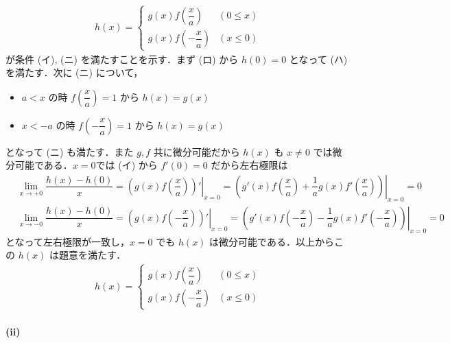 \documentclass[../../main.tex]{subfiles}
\begin{document}
\begin{align}
  h(x) =
  \begin{cases}
    g(x) f\left(\dfrac{x}{a}\right) & (0 \le x) \\
    g(x) f\left(-\dfrac{x}{a}\right) & (x \le 0)
  \end{cases}
\end{align}
が条件 (イ), (ニ) を満たすことを示す．まず (ロ) から $h(0) = 0$ となって (ハ) を満たす．次に (ニ) について，
\begin{itemize}
  \item $a < x$ の時 $f\left(\dfrac{x}{a}\right) = 1$ から $h(x) = g(x)$ \\
  \item $x < -a$ の時 $f\left(-\dfrac{x}{a}\right) = 1$ から $h(x) = g(x)$
\end{itemize}
となって (ニ) も満たす．また $g, f$ 共に微分可能だから $h(x)$ も $x \ne 0$ では微分可能である．$x=0$では (イ) から $f'(0) = 0$ だから左右極限は
\begin{align}
  & \lim_{x \to +0} \dfrac{h(x) - h(0)}{x} = \left. \left( g(x) f\left(\dfrac{x}{a}\right) \right)' \right|_{x=0} = \left. \left( g'(x) f\left(\dfrac{x}{a}\right) + \dfrac{1}{a} g(x) f'\left(\dfrac{x}{a}\right) \right) \right|_{x=0} = 0 \\
  & \lim_{x \to -0} \dfrac{h(x) - h(0)}{x} = \left. \left( g(x) f\left(-\dfrac{x}{a}\right) \right)' \right|_{x=0} = \left. \left( g'(x) f\left(-\dfrac{x}{a}\right) - \dfrac{1}{a} g(x) f'\left(-\dfrac{x}{a}\right) \right) \right|_{x=0} = 0
\end{align}
となって左右極限が一致し，$x=0$ でも $h(x)$ は微分可能である．以上からこの $h(x)$ は題意を満たす．
\begin{align}
  h(x) =
  \begin{cases}
    g(x) f\left(\dfrac{x}{a}\right) & (0 \le x) \\
    g(x) f\left(-\dfrac{x}{a}\right) & (x \le 0)
  \end{cases}
\end{align}

\paragraph{(ii)}
\end{document}
